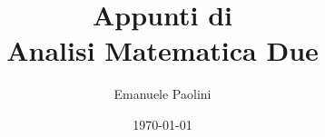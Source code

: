 \documentclass[
	fontsize=10pt, %
	twoside=true, %
	pagewidth=8.5in, %
	pageheight=11.0in, %
	numbers=noenddots, %
]{mykaobook}
\begin{document}

\title[Appunti di Analisi Matematica Due]{Appunti di\\Analisi Matematica Due}
\author{Emanuele Paolini}
\date{\today}
\publishers{manufatto}


\frontmatter %



\maketitle

\thispagestyle{empty}
\mbox{}
\vfill
\doclicenseThis


%


\begingroup %

\setlength{\textheight}{230\vscale} %
\end{document}
